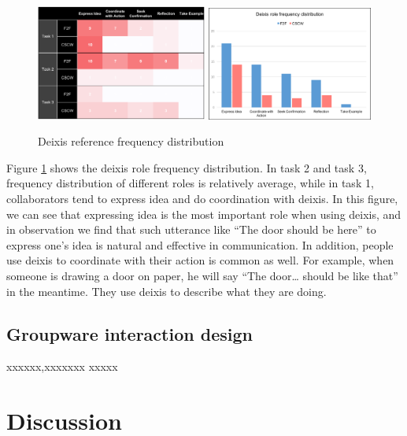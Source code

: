 \documentclass[12pt,twoside]{article}
\begin{document}
\begin{figure}
\includegraphics[width = 0.50\textwidth]{deixis_role_a.png}
\includegraphics[width = 0.486\textwidth]{deixis_role_b.png}
\caption{Deixis reference frequency distribution}
\label{Deixis_role}
\end{figure}

Figure \ref{Deixis_role} shows the deixis role frequency distribution. In task 2 and task 3, frequency distribution of different roles is relatively average, while in task 1, collaborators tend to express idea and do coordination with deixis. In this figure, we can see that expressing idea is the most important role when using deixis, and in observation we find that such utterance like “The door should be here” to express one’s idea is natural and effective in communication. In addition, people use deixis to coordinate with their action is common as well. For example, when someone is drawing a door on paper, he will say “The door… should be like that” in the meantime. They use deixis to describe what they are doing. 

\subsection{Groupware interaction design}
\label{sec:design}
xxxxxx,xxxxxxx
xxxxx

\section{Discussion}
\label{sec:discussion}
\end{document}
